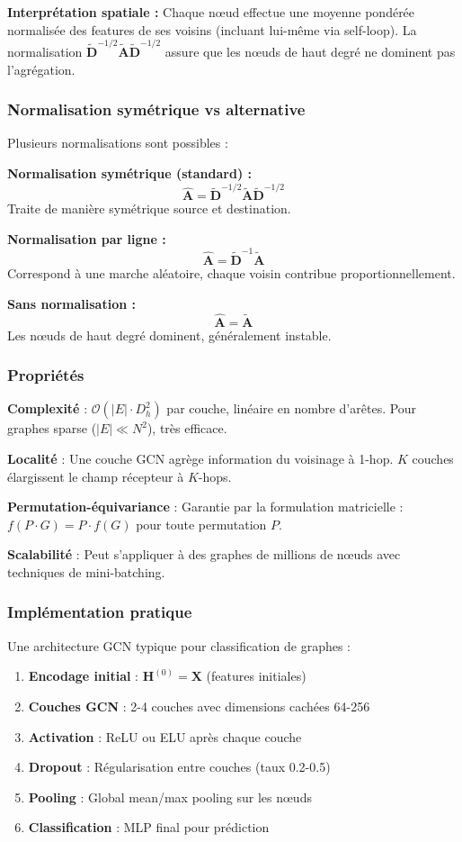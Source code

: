 \textbf{Interprétation spatiale :}
Chaque nœud effectue une moyenne pondérée normalisée des features de ses voisins (incluant lui-même via self-loop). La normalisation $\tilde{\mathbf{D}}^{-1/2}\tilde{\mathbf{A}}\tilde{\mathbf{D}}^{-1/2}$ assure que les nœuds de haut degré ne dominent pas l'agrégation.

\subsubsection{Normalisation symétrique vs alternative}

Plusieurs normalisations sont possibles :

\textbf{Normalisation symétrique (standard) :}
\[
\hat{\mathbf{A}} = \tilde{\mathbf{D}}^{-1/2}\tilde{\mathbf{A}}\tilde{\mathbf{D}}^{-1/2}
\]
Traite de manière symétrique source et destination.

\textbf{Normalisation par ligne :}
\[
\hat{\mathbf{A}} = \tilde{\mathbf{D}}^{-1}\tilde{\mathbf{A}}
\]
Correspond à une marche aléatoire, chaque voisin contribue proportionnellement.

\textbf{Sans normalisation :}
\[
\hat{\mathbf{A}} = \tilde{\mathbf{A}}
\]
Les nœuds de haut degré dominent, généralement instable.

\subsubsection{Propriétés}

\textbf{Complexité} : $\mathcal{O}(|E| \cdot D_h^2)$ par couche, linéaire en nombre d'arêtes. Pour graphes sparse ($|E| \ll N^2$), très efficace.

\textbf{Localité} : Une couche GCN agrège information du voisinage à 1-hop. $K$ couches élargissent le champ récepteur à $K$-hops.

\textbf{Permutation-équivariance} : Garantie par la formulation matricielle : $f(P \cdot G) = P \cdot f(G)$ pour toute permutation $P$.

\textbf{Scalabilité} : Peut s'appliquer à des graphes de millions de nœuds avec techniques de mini-batching.

\subsubsection{Implémentation pratique}

Une architecture GCN typique pour classification de graphes :
\begin{enumerate}
    \item \textbf{Encodage initial} : $\mathbf{H}^{(0)} = \mathbf{X}$ (features initiales)
    \item \textbf{Couches GCN} : 2-4 couches avec dimensions cachées 64-256
    \item \textbf{Activation} : ReLU ou ELU après chaque couche
    \item \textbf{Dropout} : Régularisation entre couches (taux 0.2-0.5)
    \item \textbf{Pooling} : Global mean/max pooling sur les nœuds
    \item \textbf{Classification} : MLP final pour prédiction
\end{enumerate}


